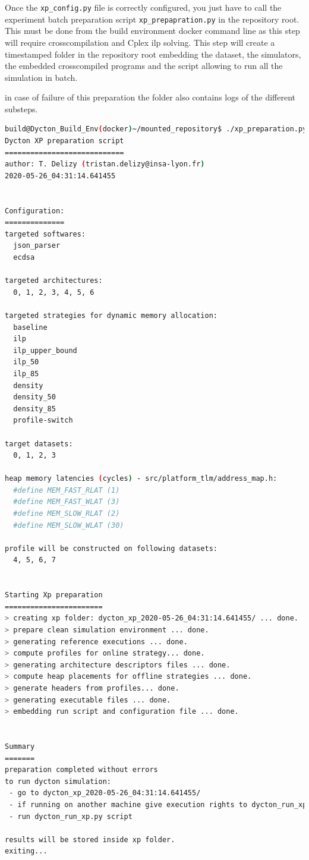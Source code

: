 \documentclass[10 pt]{article}
\begin{document}
Once the \lstinline{xp_config.py} file is correctly configured, you just have to call the experiment batch preparation script \lstinline{xp_prepapration.py} in the repository root.
This must be done from the build environment docker command line as this step will require crosscompilation and Cplex ilp solving.
This step will create a timestamped folder in the repository root embedding the dataset, the simulators, the embedded crosscompiled programs and the script allowing to run all the simulation in batch.

in case of failure of this preparation the folder also contains logs of the different substeps.


\begin{lstlisting}[language=bash]
build@Dycton_Build_Env(docker)~/mounted_repository$ ./xp_preparation.py
Dycton XP preparation script
============================
author: T. Delizy (tristan.delizy@insa-lyon.fr)
2020-05-26_04:31:14.641455


Configuration:
==============
targeted softwares:
  json_parser
  ecdsa

targeted architectures:
  0, 1, 2, 3, 4, 5, 6

targeted strategies for dynamic memory allocation:
  baseline
  ilp
  ilp_upper_bound
  ilp_50
  ilp_85
  density
  density_50
  density_85
  profile-switch

target datasets:
  0, 1, 2, 3

heap memory latencies (cycles) - src/platform_tlm/address_map.h:
  #define MEM_FAST_RLAT (1)
  #define MEM_FAST_WLAT (3)
  #define MEM_SLOW_RLAT (2)
  #define MEM_SLOW_WLAT (30)

profile will be constructed on following datasets:
  4, 5, 6, 7


Starting Xp preparation
=======================
> creating xp folder: dycton_xp_2020-05-26_04:31:14.641455/ ... done.
> prepare clean simulation environment ... done.
> generating reference executions ... done.
> compute profiles for online strategy... done.
> generating architecture descriptors files ... done.
> compute heap placements for offline strategies ... done.
> generate headers from profiles... done.
> generating executable files ... done.
> embedding run script and configuration file ... done.


Summary
=======
preparation completed without errors
to run dycton simulation:
 - go to dycton_xp_2020-05-26_04:31:14.641455/
 - if running on another machine give execution rights to dycton_run_xp.py
 - run dycton_run_xp.py script

results will be stored inside xp folder.
exiting...
\end{lstlisting}
\end{document}
